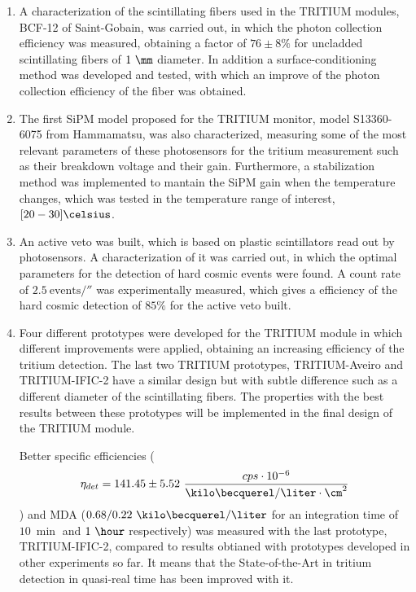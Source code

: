 \begin{enumerate}
\item{} A characterization of the scintillating fibers used in the TRITIUM modules, BCF-12 of Saint-Gobain, was carried out, in which the photon collection efficiency was measured, obtaining a factor of $76 \pm 8 \%$ for uncladded scintillating fibers of $1~\mm$ diameter. In addition a surface-conditioning method was developed and tested, with which an improve of the photon collection efficiency of the fiber was obtained.

\item{} The first SiPM model proposed for the TRITIUM monitor, model S13360-6075 from Hammamatsu, was also characterized, measuring some of the most relevant parameters of these photosensors for the tritium measurement such as their breakdown voltage and their gain. Furthermore, a stabilization method was implemented to mantain the SiPM gain when the temperature changes, which was tested in the temperature range of interest, $[20-30]\celsius$.

\item{} An active veto was built, which is based on plastic scintillators read out by photosensors. A characterization of it was carried out, in which the optimal parameters for the detection of hard cosmic events were found. A count rate of $2.5~\text{events}/\second$ was experimentally measured, which gives a efficiency of the hard cosmic detection of $85\%$ for the active veto built.

\item{} Four different prototypes were developed for the TRITIUM module in which different improvements were applied, obtaining an increasing efficiency of the tritium detection. The last two TRITIUM prototypes, TRITIUM-Aveiro and TRITIUM-IFIC-2 have a similar design but with subtle difference such as a different diameter of the scintillating fibers. The properties with the best results between these prototypes will be implemented in the final design of the TRITIUM module.

Better specific efficiencies ($$\eta_{det} = 141.45\pm5.52~\frac{cps \cdot{} 10^{-6}}{\kilo\becquerel/ \liter \cdot{} \cm^2}$$) and MDA ($0.68 /0.22~\kilo\becquerel / \liter$ for an integration time of $10~\min$ and $1~\hour$ respectively) was measured with the last prototype,  TRITIUM-IFIC-2, compared to results obtianed with prototypes developed in other experiments so far. It means that the State-of-the-Art in tritium detection in quasi-real time has been improved with it. 


\end{enumerate}
